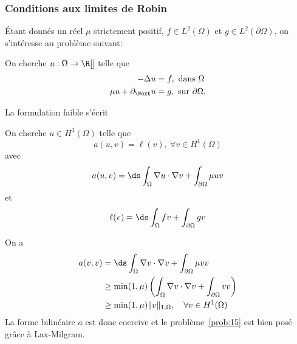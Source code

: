 \subsubsection{Conditions aux limites de Robin}
\label{sec:cond-aux-limit-3}

Étant donnés un réel $\mu$ strictement positif, $f \in L^2(\Omega)$ et $g \in
L^2(\partial \Omega)$, on s'intéresse au problème suivant:
\begin{problem}
  \label{prob:14}
  On cherche $u : \Omega \rightarrow \R[]$ telle que
  \begin{equation}
    \label{eq:83}
    \begin{split}
      -\Delta u  &= f, \mbox{ dans } \Omega\\
      \mu u + \partial_\Next u &= g, \mbox{ sur } \partial\Omega.
    \end{split}
  \end{equation}
\end{problem}
La formulation faible s'écrit
\begin{problem}
  \label{prob:15}
  On cherche $u \in H^1(\Omega)$ telle que
  \begin{equation}
    \label{eq:84}
    a( u, v ) = \ell(v),\ \forall v \in H^1(\Omega)
  \end{equation}
  avec
  \begin{equation}
    \label{eq:85}
    a( u, v ) = \ds \int_\Omega \nabla u \cdot \nabla v + \int_{\partial
    \Omega} \mu u v
  \end{equation}
  et
  \begin{equation}
    \label{eq:86}
    \ell( v ) = \ds \int_\Omega f v + \int_{\partial\Omega} g v
  \end{equation}
\end{problem}

On a
\begin{equation}
  \label{eq:69}
  \begin{split}
    a(v, v) & = \ds \int_\Omega \nabla v \cdot \nabla v + \int_{\partial\Omega} \mu v v \\
    & \geq \min(1,\mu)\left( \int_\Omega \nabla v \cdot \nabla v +
      \int_{\partial\Omega} v v\right)  \\
    &\geq \min(1,\mu) \|v\|_{1,\Omega}, \quad \forall v \in H^1(\Omega)
  \end{split}
\end{equation}
La forme bilinéaire $a$ est donc coercive et le problème~\ref{prob:15} est
bien posé grâce à Lax-Milgram.


